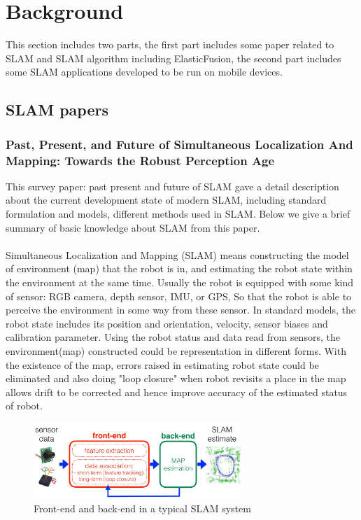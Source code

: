 \documentclass[12pt,twoside]{article}
\begin{document}
\newpage


\section{Background}
This section includes two parts, the first part includes some paper related to SLAM and SLAM algorithm including ElasticFusion, the second part includes some SLAM applications developed to be run on mobile devices.\\

\subsection{SLAM papers}


\subsubsection{Past, Present, and Future of Simultaneous Localization And Mapping: Towards the Robust Perception Age}
This survey paper: past present and future of SLAM \cite{cadena2016past} gave a detail description about the current development state of modern SLAM, including standard formulation and models, different methods used in SLAM. Below we give a brief summary of basic knowledge about SLAM from this paper.\\
\\
Simultaneous Localization and Mapping (SLAM) means constructing the model of environment (map) that the robot is in, and estimating the robot state within the environment at the same time. Usually the robot is equipped with some kind of sensor: RGB camera, depth sensor, IMU, or GPS, So that the robot is able to perceive the environment in some way from these sensor. In standard models, the robot state includes its position and orientation, velocity, sensor biases and calibration parameter. Using the robot status and  data read from sensors, the environment(map) constructed could be representation in different forms. With the existence of the map, errors raised in estimating robot state could be eliminated and also doing "loop closure" when robot revisits a place in the map allows drift to be corrected and hence improve accuracy of the estimated status of robot.\\
\begin{figure}[h]
    \centering
    \includegraphics[width=0.7\textwidth]{figures/slamStructure}
    \caption{Front-end and back-end in a typical SLAM system\cite{cadena2016past}}
    \label{fig:slamStructure}
\end{figure}
\end{document}
